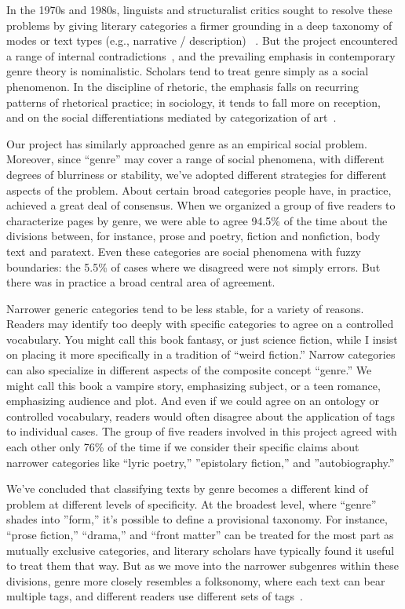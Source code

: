 \documentclass[paper=a4, fontsize=12pt]{scrartcl}
\numberwithin{equation}{section}		%
\numberwithin{figure}{section}			%
\numberwithin{table}{section}				%
\begin{document}
In the 1970s and 1980s, linguists and structuralist critics sought to resolve these problems by giving literary categories a firmer grounding in a deep taxonomy of modes or text types (e.g., narrative / description) ~\cite{genette:genre, biber:typology}. But the project encountered a range of internal contradictions~\cite{derrida:genre}, and the prevailing emphasis in contemporary genre theory is nominalistic. Scholars tend to treat genre simply as a social phenomenon. In the discipline of rhetoric, the emphasis falls on recurring patterns of rhetorical practice; in sociology, it tends to fall more on reception, and on the social differentiations mediated by categorization of art~\cite{devitt:genre, dimaggio:classification}.

Our project has similarly approached genre as an empirical social problem. Moreover, since ``genre'' may cover a range of social phenomena, with different degrees of blurriness or stability, we've adopted different strategies for different aspects of the problem. About certain broad categories people have, in practice, achieved a great deal of consensus. When we organized a group of five readers to characterize pages by genre, we were able to agree 94.5\% of the time about the divisions between, for instance, prose and poetry, fiction and nonfiction, body text and paratext. Even these categories are social phenomena with fuzzy boundaries: the 5.5\% of cases where we disagreed were not simply errors. But there was in practice a broad central area of agreement.

Narrower generic categories tend to be less stable, for a variety of reasons. Readers may identify too deeply with specific categories to agree on a controlled vocabulary. You might call this book fantasy, or just science fiction, while I insist on placing it more specifically in a tradition of ``weird fiction.'' Narrow categories can also specialize in different aspects of the composite concept ``genre.'' We might call this book a vampire story, emphasizing subject, or a teen romance, emphasizing audience and plot. And even if we could agree on an ontology or controlled vocabulary, readers would often disagree about the application of tags to individual cases. The group of five readers involved in this project agreed with each other only 76\% of the time if we consider their specific claims about narrower categories like ``lyric poetry,'' ''epistolary fiction,'' and ''autobiography.''

We've concluded that classifying texts by genre becomes a different kind of problem at different levels of specificity. At the broadest level, where ``genre'' shades into ''form,'' it's possible to define a provisional taxonomy. For instance, ``prose fiction,'' ``drama,'' and ``front matter'' can be treated for the most part as mutually exclusive categories, and literary scholars have typically found it useful to treat them that way. But as we move into the narrower subgenres within these divisions, genre more closely resembles a folksonomy, where each text can bear multiple tags, and different readers use different sets of tags~\cite{vanderwal:folksonomy}.
\end{document}
